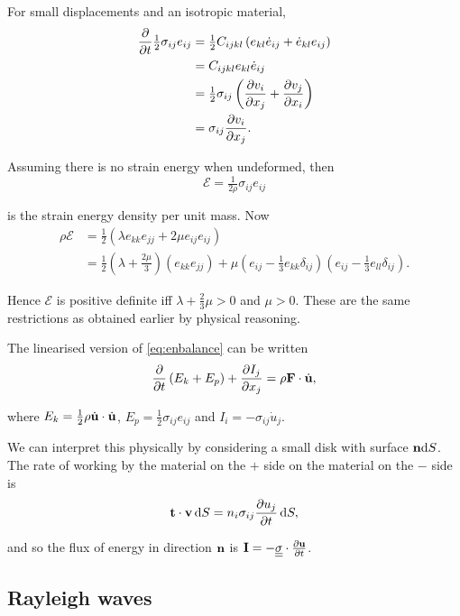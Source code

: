 \documentclass{notes}
\newcommand{\te}[1]{\underline{\underline{#1}}}
\newcommand{\cE}{\mathcal{E}}
\begin{document}
For small displacements and an isotropic material,
\begin{align*}
\frac{\partial }{\partial t} \tfrac{1}{2} \sigma_{ij} e_{ij} &= \tfrac{1}{2} C_{ijkl}
\left(e_{kl} \Dot{e}_{ij} + \Dot{e}_{kl} e_{ij}\right) \\
&= C_{ijkl} e_{kl} \Dot{e}_{ij} \\
&= \tfrac{1}{2} \sigma_{ij} \left( \frac{\partial v_i}{\partial x_j} + \frac{\partial v_j}{\partial x_i}\right) \\
&= \sigma_{ij} \frac{\partial v_i}{\partial x_j}.
\end{align*}

Assuming there is no strain energy when undeformed, then
\begin{equation}\label{eq:strainen}
\cE = \tfrac{1}{2 \rho} \sigma_{ij} e_{ij}
\end{equation}

is the strain energy density per unit mass.  Now
\begin{align*}
\rho \cE &= \tfrac{1}{2} \left( \lambda e_{kk} e_{jj} + 2 \mu e_{ij} e_{ij}
\right)\\
&= \tfrac{1}{2} \left( \lambda + \frac{2 \mu}{3}\right) \left( e_{kk} e_{jj}
\right) + \mu \left( e_{ij} - \tfrac{1}{3} e_{kk} \delta_{ij}\right)
\left(e_{ij} - \tfrac{1}{3} e_{ll} \delta_{ij} \right).
\end{align*}

Hence $\cE$ is positive definite iff $\lambda + \tfrac{2}{3} \mu > 0$
and $\mu > 0$.  These are the same restrictions as obtained earlier by
physical reasoning.

The linearised version of \eqref{eq:enbalance} can be written
\begin{equation}\label{eq:solid:strainen2}
\frac{\partial }{\partial t} \left( E_k + E_p \right) + \frac{\partial I_j}{\partial x_j} = \rho \mathbf{F} \cdot \Dot {\mathbf{u}},
\end{equation}

where $E_k = \tfrac{1}{2} \rho \Dot{\mathbf{u}} \cdot \Dot{\mathbf{u}}$,
$E_p = \tfrac{1}{2} \sigma_{ij} e_{ij}$ and $I_i = - \sigma_{ij} \Dot{u}_j$.

We can interpret this physically by considering a small disk with surface
$\mathbf{n} \mathrm{d} S$. The rate of working by the material on the $+$ side on the
material on the $-$ side is
\[
\mathbf{t} \cdot \mathbf{v}\, \mathrm{d} S = n_i \sigma_{ij} \frac{\partial u_j}{\partial t}\, \mathrm{d} S,
\]

and so the flux of energy in direction $\mathbf{n}$ is $\vect{I} = - \te{\sigma}
\cdot \pddt{\vu}$.

\subsection{Rayleigh waves}
\end{document}
